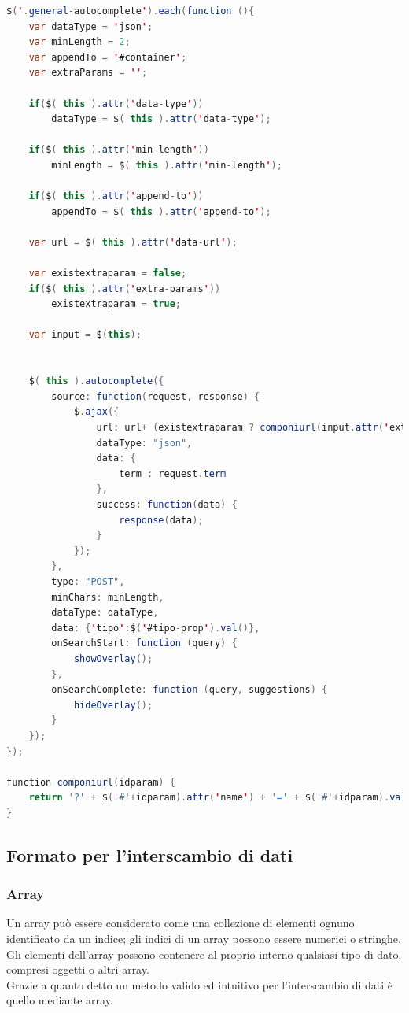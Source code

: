 \begin{lstlisting}[language=Java, caption=JavaScript per EasyAutocomplete]
$('.general-autocomplete').each(function (){
    var dataType = 'json';
    var minLength = 2;
    var appendTo = '#container';
    var extraParams = '';

    if($( this ).attr('data-type'))
        dataType = $( this ).attr('data-type');

    if($( this ).attr('min-length'))
        minLength = $( this ).attr('min-length');

    if($( this ).attr('append-to'))
        appendTo = $( this ).attr('append-to');

    var url = $( this ).attr('data-url');

    var existextraparam = false;
    if($( this ).attr('extra-params'))
        existextraparam = true;

    var input = $(this);


    $( this ).autocomplete({
        source: function(request, response) {
            $.ajax({
                url: url+ (existextraparam ? componiurl(input.attr('extra-params')) : ''),
                dataType: "json",
                data: {
                    term : request.term
                },
                success: function(data) {
                    response(data);
                }
            });
        },
        type: "POST",
        minChars: minLength,
        dataType: dataType,
        data: {'tipo':$('#tipo-prop').val()},
        onSearchStart: function (query) {
            showOverlay();
        },
        onSearchComplete: function (query, suggestions) {
            hideOverlay();
        }
    });
});

function componiurl(idparam) {
    return '?' + $('#'+idparam).attr('name') + '=' + $('#'+idparam).val();
}
\end{lstlisting}
\newpage

\subsection{Formato per l'interscambio di dati}
\subsubsection{Array}
Un array può essere considerato come una collezione di elementi ognuno identificato da un indice; gli indici di un array possono essere numerici o stringhe. Gli elementi dell'array possono contenere al proprio interno qualsiasi tipo di dato, compresi oggetti o altri array.
\\
Grazie a quanto detto un metodo valido ed intuitivo per l'interscambio di dati è quello mediante array.
